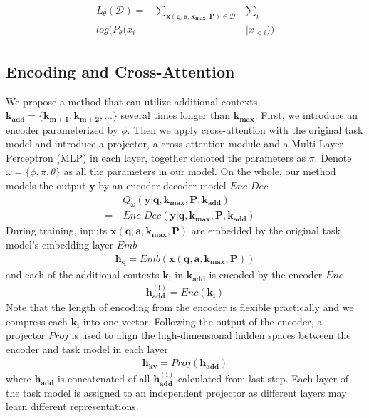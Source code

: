 \begin{align}\label{objective}
\begin{split}
L_\theta(\mathcal{D}) = - \sum\limits_{ \bm{x}(\bm{q}, \bm{a}, \bm{k_{max}}, \bm{P}) \in \mathcal{D}} &\sum\limits_{i} \\[4pt] 
log(P_\theta(x_i&|x_{<i}))
\end{split}
\end{align}

\subsection{Encoding and Cross-Attention}
\label{enc_and_cros}
We propose a method that can utilize additional contexts $\bm{k_{add}} = \{\bm{k_{m+1}}, \bm{k_{m+2}}, ...\}$ several times longer than $\bm{k_{max}}$. First, we introduce an encoder parameterized by $\phi$. Then we apply cross-attention with the original task model and introduce a projector, a cross-attention module and a Multi-Layer Perceptron (MLP) in each layer, together denoted the parameters as $\pi$. Denote $\omega=\{\phi, \pi, \theta\}$ as all the parameters in our model. On the whole, our method models the output $\bm{y}$ by an encoder-decoder model $Enc$-$Dec$
\vspace{1pt}
\begin{align*}
&Q_{\omega}(\bm{y} | \bm{q}, \bm{k_{max}}, \bm{P}, \bm{k_{add}}) \quad \\[4pt]
= ~ &Enc\text{-}Dec(\bm{y} | \bm{q}, \bm{k_{max}}, \bm{P}, \bm{k_{add}}) \quad
\end{align*}
During training, inputs $\bm{x} (\bm{q}, \bm{a}, \bm{k_{max}}, \bm{P})$ are embedded by the original task model's embedding layer $Emb$
\vspace{1pt}
\begin{align*}
\bm{h_{q}} = Emb(\bm{x} (\bm{q}, \bm{a}, \bm{k_{max}}, \bm{P}))
\end{align*}
and each of the additional contexts $\bm{k_i}$ in  $\bm{k_{add}}$ is encoded by the encoder $Enc$
\vspace{1pt}
\begin{align*}
\bm{h_{add}^{(i)}} = Enc(\bm{k_i})
\end{align*}
Note that the length of encoding from the encoder is flexible practically and we compress each $\bm{k_i}$ into one vector. Following the output of the encoder, a projector $Proj$ is used to align the high-dimensional hidden spaces between the encoder and task model in each layer
\vspace{1pt}
\begin{align*}
\bm{h_{kv}} = Proj(\bm{h_{add}})
\end{align*}
where $\bm{h_{add}}$ is concatenated of all $\bm{h_{add}^{(i)}}$ calculated from last step. Each layer of the task model is assigned to an independent projector as different layers may learn different representations.

